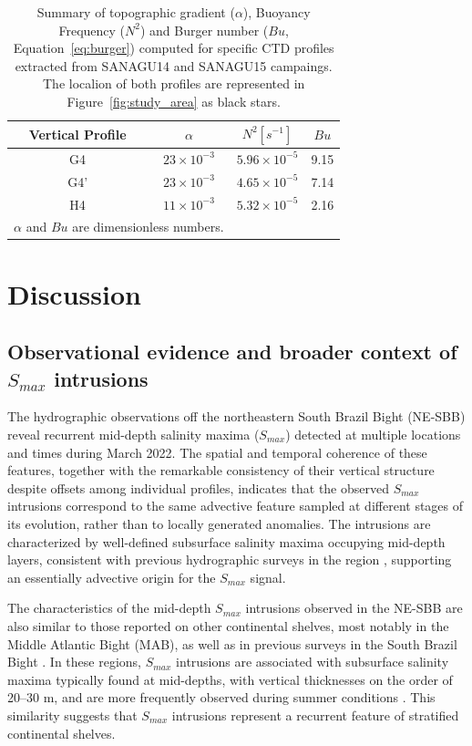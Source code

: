 \documentclass[draft]{agujournal2019}
\begin{document}
\begin{table}[ht!]
\caption{Summary of topographic gradient ($\alpha$), Buoyancy Frequency ($N^2$) and Burger number ($Bu$, Equation~\ref{eq:burger}) computed for specific CTD profiles extracted from SANAGU14 and SANAGU15 campaings. The localion of both profiles are represented in Figure~\ref{fig:study_area} as black stars.}
\label{tab:burger_number}
\centering
\begin{tabular}{c c c c}
\hline
\textbf{Vertical Profile} & \textbf{$\alpha$} & \textbf{$N^2 [s^{-1}]$} & \textbf{$Bu$} \\
\hline
        G4 & $23 \times 10^{-3}$ & $5.96 \times 10^{-5}$ & 9.15 \\
        G4' & $23 \times 10^{-3}$ & $4.65 \times 10^{-5}$ & 7.14 \\
        H4 & $11 \times 10^{-3}$ & $5.32 \times 10^{-5}$ & 2.16 \\
\hline
\multicolumn{2}{l}{$\alpha$ and $Bu$ are dimensionless numbers.}
\end{tabular}
\end{table}

\section{Discussion}
\label{section:discussion}

\subsection{Observational evidence and broader context of \textit{$S_{max}$} intrusions}
\label{subsec:discussion_smax_nesbb}

The hydrographic observations off the northeastern South Brazil Bight (NE-SBB) reveal recurrent mid-depth salinity maxima (\textit{$S_{max}$}) detected at multiple locations and times during March 2022. The spatial and temporal coherence of these features, together with the remarkable consistency of their vertical structure despite offsets among individual profiles, indicates that the observed \textit{$S_{max}$} intrusions correspond to the same advective feature sampled at different stages of its evolution, rather than to locally generated anomalies. The intrusions are characterized by well-defined subsurface salinity maxima occupying mid-depth layers, consistent with previous hydrographic surveys in the region \cite{silva2023inventory}, supporting an essentially advective origin for the \textit{$S_{max}$} signal.

The characteristics of the mid-depth \textit{$S_{max}$} intrusions observed in the NE-SBB are also similar to those reported on other continental shelves, most notably in the Middle Atlantic Bight (MAB), as well as in previous surveys in the South Brazil Bight \cite{Campos2000, castro2014summer, silva2023inventory}. In these regions, \textit{$S_{max}$} intrusions are associated with subsurface salinity maxima typically found at mid-depths, with vertical thicknesses on the order of 20–30 m, and are more frequently observed during summer conditions \cite{Lentz2003}. This similarity suggests that \textit{$S_{max}$} intrusions represent a recurrent feature of stratified continental shelves.
\end{document}
